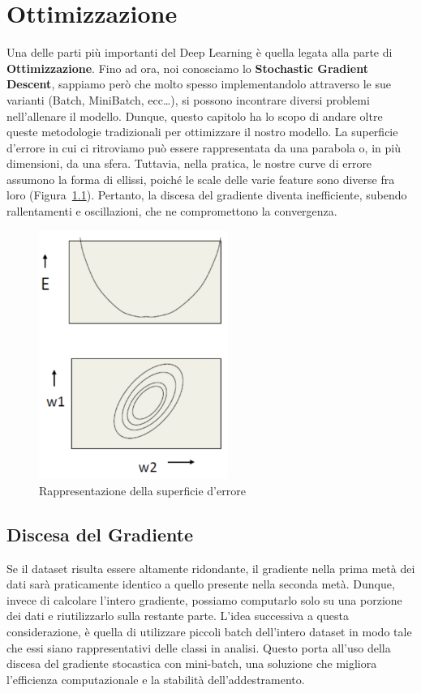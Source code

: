 \chapter{Ottimizzazione}
Una delle parti più importanti del Deep Learning è quella legata alla parte di \textbf{Ottimizzazione}. Fino ad ora, noi conosciamo lo 	\textbf{Stochastic Gradient Descent}, sappiamo però che molto spesso implementandolo attraverso le sue varianti (Batch, MiniBatch, ecc\dots), si possono incontrare diversi problemi nell'allenare il modello. Dunque, questo capitolo ha lo scopo di andare oltre queste metodologie tradizionali per ottimizzare il nostro modello. La superficie d'errore in cui ci ritroviamo può essere rappresentata da una parabola o, in più dimensioni, da una sfera. Tuttavia, nella pratica, le nostre curve di errore assumono la forma di ellissi, poiché le scale delle varie feature sono diverse fra loro (Figura~\ref{fig:error_surface}). Pertanto, la discesa del gradiente diventa inefficiente, subendo rallentamenti e oscillazioni, che ne compromettono la convergenza.

\begin{figure}[h]
\centering
\includegraphics[width=0.55\textwidth]{figure/error_surface.png}
\caption{Rappresentazione della superficie d'errore}
\label{fig:error_surface}
\end{figure}

\section{Discesa del Gradiente}
Se il dataset risulta essere altamente ridondante, il gradiente nella prima metà dei dati sarà praticamente identico a quello presente nella seconda metà. Dunque, invece di calcolare l'intero gradiente, possiamo computarlo solo su una porzione dei dati e riutilizzarlo sulla restante parte. L'idea successiva a questa considerazione, è quella di utilizzare piccoli batch dell'intero dataset in modo tale che essi siano rappresentativi delle classi in analisi. Questo porta all'uso della discesa del gradiente stocastica con mini-batch, una soluzione che migliora l'efficienza computazionale e la stabilità dell'addestramento.


